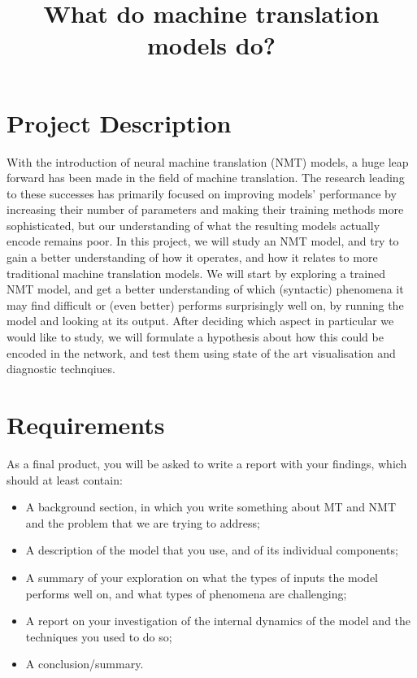 \documentclass{article}
\title{What do machine translation models do?}
\begin{document}
\maketitle

\section*{Project Description}

With the introduction of neural machine translation (NMT) models, a huge leap forward has been made in the field of machine translation.
The research leading to these successes has primarily focused on improving models' performance by increasing their number of parameters and making their training methods more sophisticated, but our understanding of what the resulting models actually encode remains poor.
In this project, we will study an NMT model, and try to gain a better understanding of how it operates, and how it relates to more traditional machine translation models.
We will start by exploring a trained NMT model, and get a better understanding of which (syntactic) phenomena it may find difficult or (even better) performs surprisingly well on, by running the model and looking at its output.
After deciding which aspect in particular we would like to study, we will formulate a hypothesis about how this could be encoded in the network, and test them using state of the art visualisation and diagnostic technqiues.

\section*{Requirements}
As a final product, you will be asked to write a report with your findings, which should at least contain:\begin{itemize}
	\item A background section, in which you write something about MT and NMT  and the problem that we are trying to address;
    \item A description of the model that you use, and of its individual components;
    \item A summary of your exploration on what the types of inputs the model performs well on, and what types of phenomena are challenging;
    \item A report on your investigation of the internal dynamics of the model and the techniques you used to do so;
    \item A conclusion/summary.
\end{itemize}
\end{document}
